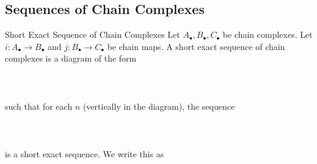 \documentclass[a4paper]{article}
\begin{document}
\subsection{Sequences of Chain Complexes}
\begin{defn}{Short Exact Sequence of Chain Complexes}{} Let $A_\bullet,B_\bullet,C_\bullet$ be chain complexes. Let $i:A_\bullet\to B_\bullet$ and $j:B_\bullet\to C_\bullet$ be chain maps. A short exact sequence of chain complexes is a diagram of the form \\~\\
\\~\\
such that for each $n$ (vertically in the diagram), the sequence \\~\\
\\~\\ is a short exact sequence. We write this as \\~\\
\end{defn}
\end{document}

